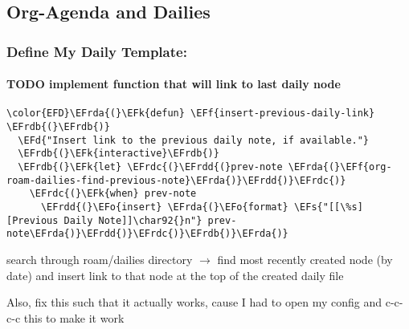 \documentclass{article}
\newcommand{\EFs}[1]{\textcolor{EFs}{#1}} %
\newcommand{\EFd}[1]{\textcolor{EFd}{#1}} %
\newcommand{\EFk}[1]{\textcolor{EFk}{#1}} %
\newcommand{\EFf}[1]{\textcolor{EFf}{#1}} %
\newcommand{\EFo}[1]{\textcolor{EFo}{#1}} %
\newcommand{\EFrda}[1]{\textcolor{EFrda}{#1}} %
\newcommand{\EFrdb}[1]{\textcolor{EFrdb}{#1}} %
\newcommand{\EFrdc}[1]{\textcolor{EFrdc}{#1}} %
\newcommand{\EFrdd}[1]{\textcolor{EFrdd}{#1}} %
\begin{document}
\begin{Code}
\begin{Verbatim}
\end{Verbatim}
\end{Code}

\subsection{Org-Agenda and Dailies}
\label{sec:org2e9bfa5}
\subsubsection{Define My Daily Template:}
\label{sec:orgc68f9ac}
\paragraph{{\bfseries\sffamily TODO} implement function that will link to last daily node}
\label{sec:org18d6df0}
\begin{Code}
\begin{Verbatim}
\color{EFD}\EFrda{(}\EFk{defun} \EFf{insert-previous-daily-link} \EFrdb{(}\EFrdb{)}
  \EFd{"Insert link to the previous daily note, if available."}
  \EFrdb{(}\EFk{interactive}\EFrdb{)}
  \EFrdb{(}\EFk{let} \EFrdc{(}\EFrdd{(}prev-note \EFrda{(}\EFf{org-roam-dailies-find-previous-note}\EFrda{)}\EFrdd{)}\EFrdc{)}
    \EFrdc{(}\EFk{when} prev-note
      \EFrdd{(}\EFo{insert} \EFrda{(}\EFo{format} \EFs{"[[\%s][Previous Daily Note]]\char92{}n"} prev-note\EFrda{)}\EFrdd{)}\EFrdc{)}\EFrdb{)}\EFrda{)}
\end{Verbatim}
\end{Code}

search through roam/dailies directory \(\to\) find most recently created node (by date) and insert link to that node at the top of the created daily file

Also, fix this such that it actually works, cause I had to open my config and c-c-c-c this to make it work
\end{document}
